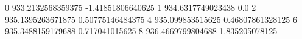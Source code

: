0 933.2132568359375 -1.41851806640625
1 934.6317749023438 0.0
2 935.1395263671875 0.50775146484375
4 935.099853515625 0.46807861328125
6 935.3488159179688 0.717041015625
8 936.4669799804688 1.835205078125
